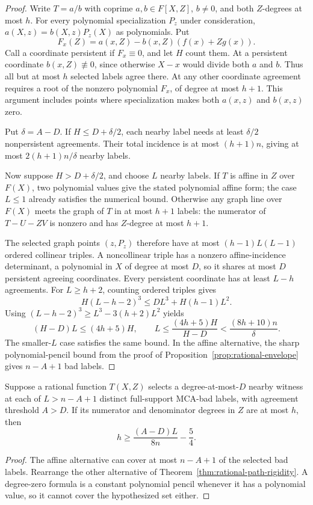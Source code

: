 \begin{proof}
Write $T=a/b$ with coprime $a,b\in F[X,Z]$, $b\ne0$, and both
$Z$-degrees at most $h$. For every polynomial specialization $P_z$ under
consideration, $a(X,z)=b(X,z)P_z(X)$ as polynomials. Put
\[
 F_x(Z)=a(x,Z)-b(x,Z)(f(x)+Zg(x)).
\]
Call a coordinate persistent if $F_x\equiv0$, and let $H$ count them.
At a persistent coordinate $b(x,Z)\not\equiv0$, since otherwise $X-x$
would divide both $a$ and $b$. Thus all but at most $h$ selected labels
agree there. At any other coordinate agreement requires a root of the
nonzero polynomial $F_x$, of degree at most $h+1$. This argument includes
points where specialization makes both $a(x,z)$ and $b(x,z)$ zero.

Put $\delta=A-D$. If $H\le D+\delta/2$, each nearby label needs at
least $\delta/2$ nonpersistent agreements. Their total incidence is at
most $(h+1)n$, giving at most $2(h+1)n/\delta$ nearby labels.

Now suppose $H>D+\delta/2$, and choose $L$ nearby labels. If $T$ is
affine in $Z$ over $F(X)$, two polynomial values give the stated
polynomial affine form; the case $L\le1$ already satisfies the numerical
bound. Otherwise any graph line over $F(X)$ meets the graph of $T$ in
at most $h+1$ labels: the numerator of $T-U-ZV$ is nonzero and has
$Z$-degree at most $h+1$.

The selected graph points $(z,P_z)$ therefore have at most
$(h-1)L(L-1)$ ordered collinear triples. A noncollinear triple has a
nonzero affine-incidence determinant, a polynomial in $X$ of degree
at most $D$, so it shares at most $D$ persistent agreeing coordinates.
Every persistent coordinate has at least $L-h$ agreements. For
$L\ge h+2$, counting ordered triples gives
\[
 H(L-h-2)^3\le DL^3+H(h-1)L^2.
\]
Using $(L-h-2)^3\ge L^3-3(h+2)L^2$ yields
\[
 (H-D)L\le(4h+5)H,
 \qquad L\le\frac{(4h+5)H}{H-D}
       <\frac{(8h+10)n}{\delta}.
\]
The smaller-$L$ case satisfies the same bound. In the affine alternative,
the sharp polynomial-pencil bound from the proof of
Proposition~\ref{prop:rational-envelope} gives $n-A+1$ bad labels.
\end{proof}

\begin{corollary}
\label{cor:rational-witness-degree}
Suppose a rational function $T(X,Z)$ selects a degree-at-most-$D$ nearby
witness at each of $L>n-A+1$ distinct full-support MCA-bad labels, with
agreement threshold $A>D$. If its numerator and denominator degrees in
$Z$ are at most $h$, then
\[
 h\ge\frac{(A-D)L}{8n}-\frac54.
\]
\end{corollary}
\begin{proof}
The affine alternative can cover at most $n-A+1$ of the selected bad
labels. Rearrange the other alternative of
Theorem~\ref{thm:rational-path-rigidity}. A degree-zero formula is a
constant polynomial pencil whenever it has a polynomial value, so it
cannot cover the hypothesized set either.
\end{proof}

